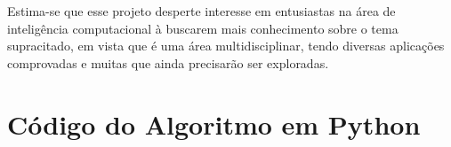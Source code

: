 \documentclass[a4paper,11pt]{article}
\begin{document}
		Estima-se que esse projeto desperte interesse em entusiastas na área de inteligência computacional à buscarem mais conhecimento sobre o tema supracitado, em vista que é uma área multidisciplinar, tendo diversas aplicações comprovadas e muitas que ainda precisarão ser exploradas.
	
	
		\newpage
		\nocite{Capitulo3Perceptron}
		\nocite{RedeNeuralComJava}
		
		 
		
		
	
		\newpage
		\section*{Código do Algoritmo em Python}
\end{document}
